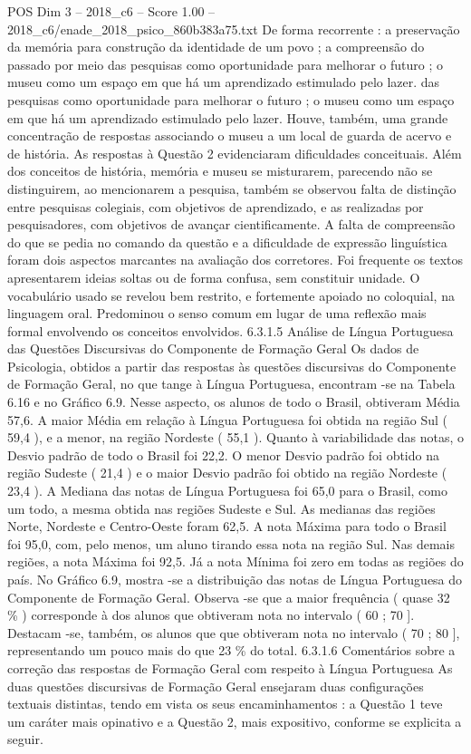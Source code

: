 \begin{textsample}{POS Dim 3 – 2018\_c6 – Score 1.00 – 2018\_c6/enade\_2018\_psico\_860b383a75.txt}
De forma recorrente : a preservação da memória para construção da identidade de um povo ; a compreensão do passado por meio das pesquisas como oportunidade para melhorar o futuro ; o museu como um espaço em que há um aprendizado estimulado pelo lazer. das pesquisas como oportunidade para melhorar o futuro ; o museu como um espaço em que há um aprendizado estimulado pelo lazer.
Houve, também, uma grande concentração de respostas associando o museu a um local de guarda de acervo e de história.
As respostas à Questão 2 evidenciaram dificuldades conceituais.
Além dos conceitos de história, memória e museu se misturarem, parecendo não se distinguirem, ao mencionarem a pesquisa, também se observou falta de distinção entre pesquisas colegiais, com objetivos de aprendizado, e as realizadas por pesquisadores, com objetivos de avançar cientificamente.
A falta de compreensão do que se pedia no comando da questão e a dificuldade de expressão linguística foram dois aspectos marcantes na avaliação dos corretores.
Foi frequente os textos apresentarem ideias soltas ou de forma confusa, sem constituir unidade.
O vocabulário usado se revelou bem restrito, e fortemente apoiado no coloquial, na linguagem oral.
Predominou o senso comum em lugar de uma reflexão mais formal envolvendo os conceitos envolvidos. 6.3.1.5 Análise de Língua Portuguesa das Questões Discursivas do Componente de Formação Geral Os dados de Psicologia, obtidos a partir das respostas às questões discursivas do Componente de Formação Geral, no que tange à Língua Portuguesa, encontram -se na Tabela 6.16 e no Gráfico 6.9.
Nesse aspecto, os alunos de todo o Brasil, obtiveram Média 57,6.
A maior Média em relação à Língua Portuguesa foi obtida na região Sul ( 59,4 ), e a menor, na região Nordeste ( 55,1 ).
Quanto à variabilidade das notas, o Desvio padrão de todo o Brasil foi 22,2.
O menor Desvio padrão foi obtido na região Sudeste ( 21,4 ) e o maior Desvio padrão foi obtido na região Nordeste ( 23,4 ).
A Mediana das notas de Língua Portuguesa foi 65,0 para o Brasil, como um todo, a mesma obtida nas regiões Sudeste e Sul.
As medianas das regiões Norte, Nordeste e Centro-Oeste foram 62,5.
A nota Máxima para todo o Brasil foi 95,0, com, pelo menos, um aluno tirando essa nota na região Sul.
Nas demais regiões, a nota Máxima foi 92,5.
Já a nota Mínima foi zero em todas as regiões do país.
No Gráfico 6.9, mostra -se a distribuição das notas de Língua Portuguesa do Componente de Formação Geral.
Observa -se que a maior frequência ( quase 32 \% ) corresponde à dos alunos que obtiveram nota no intervalo ( 60 ; 70 ].
Destacam -se, também, os alunos que que obtiveram nota no intervalo ( 70 ; 80 ], representando um pouco mais do que 23 \% do total. 6.3.1.6 Comentários sobre a correção das respostas de Formação Geral com respeito à Língua Portuguesa As duas questões discursivas de Formação Geral ensejaram duas configurações textuais distintas, tendo em vista os seus encaminhamentos : a Questão 1 teve um caráter mais opinativo e a Questão 2, mais expositivo, conforme se explicita a seguir.

\end{textsample}
